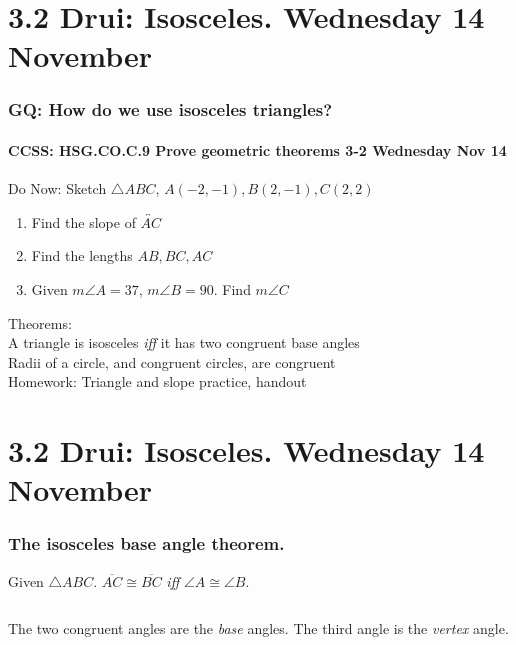 \documentclass{beamer}
\begin{document}
\section{3.2 Drui: Isosceles. Wednesday 14 November}
  \frame
  {
    \frametitle{GQ: How do we use isosceles triangles?}
    \framesubtitle{CCSS: HSG.CO.C.9 Prove geometric theorems  \alert{3-2 Wednesday Nov 14}}

    \begin{block}{Do Now: Sketch $\triangle ABC$, $A(-2,-1), B(2,-1), C(2,2)$}
      \begin{enumerate}
          \item Find the slope of $\overleftrightarrow{AC}$
          \item Find the lengths $AB, BC, AC$
          \item Given $m\angle A=37$, $m\angle B=90$. Find $m\angle C$
      \end{enumerate}
    \end{block}
    Theorems: \\
    A triangle is isosceles \emph{iff} it has two congruent base angles \\
    Radii of a circle, and congruent circles, are congruent\\[0.2cm]
    Homework: Triangle and slope practice, handout
    }

\section{3.2 Drui: Isosceles. Wednesday 14 November}
  \frame
  {
    \frametitle{The isosceles base angle theorem.}

  Given $\triangle ABC$. $\overline{AC} \cong \overline{BC}$ \emph{iff} $\angle A \cong \angle B$.\\[0.5cm]
  \begin{columns}
    \column{5cm}
    \column{4cm}
      The two congruent angles are the \emph{base} angles. The third angle is the \emph{vertex} angle.
  \end{columns}
  }
\end{document}
